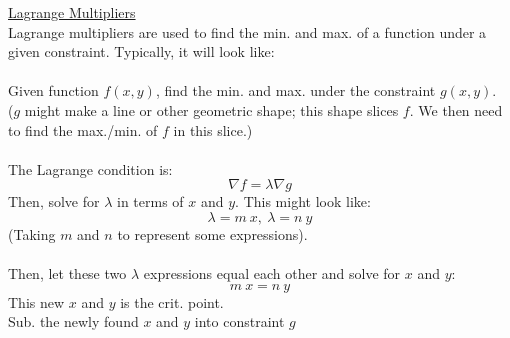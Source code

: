 \documentclass[12pt]{article}
\begin{document}
\underline{Lagrange Multipliers}\\
Lagrange multipliers are used to find the min. and max. of a function under a given constraint. Typically, it will look like:\\\\
Given function $f(x,y)$, find the min. and max. under the constraint $g(x,y)$.\\
\indent
($g$ might make a line or other geometric shape; this shape slices $f$. We then need to find the max./min. of $f$ in this slice.)\\\\

The Lagrange condition is:
$$
\nabla f = \lambda \nabla g
$$
Then, solve for $\lambda$ in terms of $x$ and $y$. This might look like:
$$
\lambda = m \ x, \ \lambda = n \ y
$$
(Taking $m$ and $n$ to represent some expressions).\\\\

Then, let these two $\lambda$ expressions equal each other and solve for $x$ and $y$:\\
$$
m \ x = n \ y
$$
This new $x$ and $y$ is the crit. point.\\
Sub. the newly found $x$ and $y$ into constraint $g$
\end{document}
